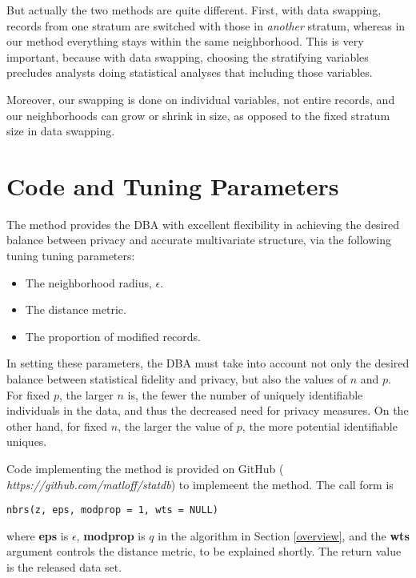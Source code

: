 \documentclass[11pt]{article}
\begin{document}
But actually the two methods are quite different.  First, with data
swapping, records from one stratum are switched with those in {\it
another} stratum, whereas in our method everything stays within the same
neighborhood.  This is very important, because with data swapping,
choosing the stratifying variables precludes analysts doing statistical
analyses that including those variables.

Moreover, our swapping is done on individual variables, not entire
records, and our neighborhoods can grow or shrink in size, as opposed to
the fixed stratum size in data swapping.  

\section{Code and Tuning Parameters}

The method provides the DBA with excellent flexibility in achieving the
desired balance between privacy and accurate multivariate structure, via
the following tuning tuning parameters:

\begin{itemize}

\item The neighborhood radius, $\epsilon$.

\item The distance metric.

\item The proportion of modified records.  

\end{itemize}

In setting these parameters, the DBA must take into account not only the
desired balance between statistical fidelity and privacy, but also the
values of $n$ and $p$.  For fixed $p$, the larger $n$ is, the fewer the
number of uniquely identifiable individuals in the data, and thus the
decreased need for privacy measures.  On the other hand, for fixed $n$,
the larger the value of $p$, the more potential identifiable uniques.

Code implementing the method is provided on GitHub ({\it
https://github.com/matloff/statdb}) to implemeent the method.  The call
form is

\begin{lstlisting}
nbrs(z, eps, modprop = 1, wts = NULL) 
\end{lstlisting}

where {\bf eps} is $\epsilon$, {\bf modprop} is $q$ in the algorithm
in Section \ref{overview}, and the {\bf wts} argument controls the
distance metric, to be explained shortly.  The return value is the
released data set.
\end{document}
